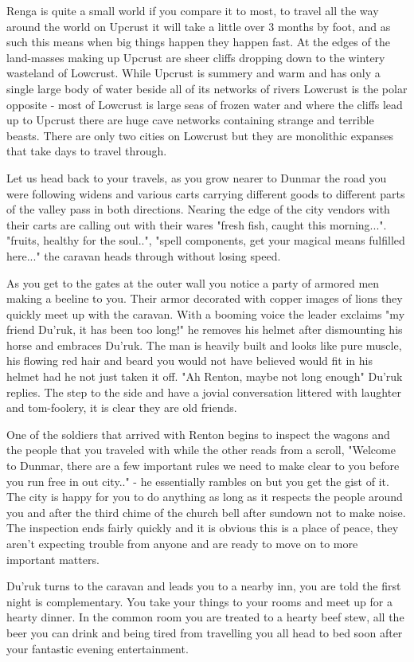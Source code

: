 \documentclass[10pt,twoside,twocolumn]{article}
\begin{document}
\begin{quotebox}
Renga is quite a small world if you compare it to most, to travel all the way around the world on Upcrust it will take a little over 3 months by foot, and as such this means when big things happen they happen fast. At the edges of the land-masses making up Upcrust are sheer cliffs dropping down to the wintery wasteland of Lowcrust. While Upcrust is summery and warm and has only a single large body of water beside all of its networks of rivers Lowcrust is the polar opposite - most of Lowcrust is large seas of frozen water and where the cliffs lead up to Upcrust there are huge cave networks containing strange and terrible beasts. There are only two cities on Lowcrust but they are monolithic expanses that take days to travel through.

Let us head back to your travels, as you grow nearer to Dunmar the road you were following widens and various carts carrying different goods to different parts of the valley pass in both directions. Nearing the edge of the city vendors with their carts are calling out with their wares "fresh fish, caught this morning...". "fruits, healthy for the soul..", "spell components, get your magical means fulfilled here..." the caravan heads through without losing speed.

As you get to the gates at the outer wall you notice a party of armored men making a beeline to you. Their armor decorated with copper images of lions they quickly meet up with the caravan. With a booming voice the leader exclaims "my friend Du'ruk, it has been too long!" he removes his helmet after dismounting his horse and embraces Du'ruk. The man is heavily built and looks like pure muscle, his flowing red hair and beard you would not have believed would fit in his helmet had he not just taken it off. "Ah Renton, maybe not long enough" Du'ruk replies. The step to the side and have a jovial conversation littered with laughter and tom-foolery, it is clear they are old friends.

One of the soldiers that arrived with Renton begins to inspect the wagons and the people that you traveled with while the other reads from a scroll, "Welcome to Dunmar, there are a few important rules we need to make clear to you before you run free in out city.." - he essentially rambles on but you get the gist of it. The city is happy for you to do anything as long as it respects the people around you and after the third chime of the church bell after sundown not to make noise. The inspection ends fairly quickly and it is obvious this is a place of peace, they aren't expecting trouble from anyone and are ready to move on to more important matters.

Du'ruk turns to the caravan and leads you to a nearby inn, you are told the first night is complementary. You take your things to your rooms and meet up for a hearty dinner. In the common room you are treated to a hearty beef stew, all the beer you can drink and being tired from travelling you all head to bed soon after your fantastic evening entertainment.
\end{quotebox}
\end{document}
